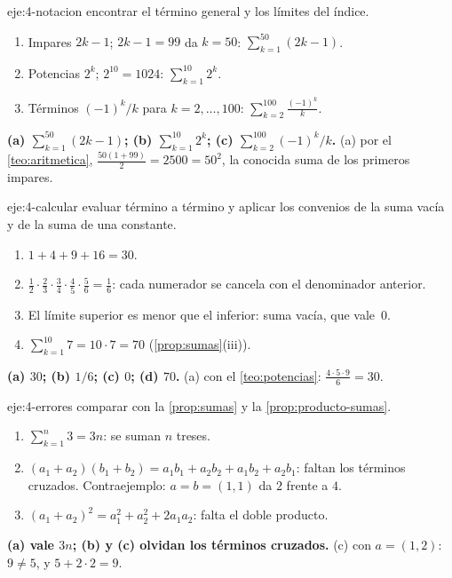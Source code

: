 \begin{solucion}{eje:4-notacion}
\planteamiento encontrar el término general y los límites del índice.
\pasos
\begin{enumerate}[label=(\alph*)]
  \item Impares $2k-1$; $2k-1=99$ da $k=50$: $\sum_{k=1}^{50}(2k-1)$.
  \item Potencias $2^k$; $2^{10}=1024$: $\sum_{k=1}^{10}2^k$.
  \item Términos $(-1)^k/k$ para $k=2,\dots,100$: $\sum_{k=2}^{100}\frac{(-1)^k}{k}$.
\end{enumerate}
\resultado \textbf{(a) $\sum_{k=1}^{50}(2k-1)$; (b) $\sum_{k=1}^{10}2^k$; (c) $\sum_{k=2}^{100}(-1)^k/k$.}
\comprobacion (a) por el \cref{teo:aritmetica}, $\frac{50(1+99)}2=2500=50^2$, la conocida suma de los primeros impares.
\end{solucion}

\begin{solucion}{eje:4-calcular}
\planteamiento evaluar término a término y aplicar los convenios de la suma vacía y de la suma de una constante.
\pasos
\begin{enumerate}[label=(\alph*)]
  \item $1+4+9+16=30$.
  \item $\frac12\cdot\frac23\cdot\frac34\cdot\frac45\cdot\frac56=\frac16$: cada numerador se cancela con el denominador anterior.
  \item El límite superior es menor que el inferior: suma vacía, que vale~$0$.
  \item $\sum_{k=1}^{10}7=10\cdot7=70$ (\cref{prop:sumas}(iii)).
\end{enumerate}
\resultado \textbf{(a) $30$; (b) $1/6$; (c) $0$; (d) $70$.}
\comprobacion (a) con el \cref{teo:potencias}: $\frac{4\cdot5\cdot9}6=30$.
\end{solucion}

\begin{solucion}{eje:4-errores}
\planteamiento comparar con la \cref{prop:sumas} y la \cref{prop:producto-sumas}.
\pasos
\begin{enumerate}[label=(\alph*)]
  \item $\sum_{k=1}^n3=3n$: se suman $n$ treses.
  \item $(a_1+a_2)(b_1+b_2)=a_1b_1+a_2b_2+a_1b_2+a_2b_1$: faltan los términos cruzados. Contraejemplo: $a=b=(1,1)$ da $2$ frente a $4$.
  \item $(a_1+a_2)^2=a_1^2+a_2^2+2a_1a_2$: falta el doble producto.
\end{enumerate}
\resultado \textbf{(a) vale $3n$; (b) y (c) olvidan los términos cruzados.}
\comprobacion (c) con $a=(1,2)$: $9\neq5$, y $5+2\cdot2=9$.
\end{solucion}

